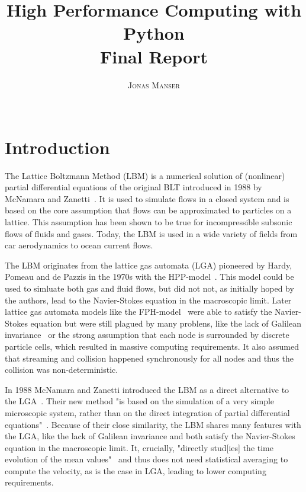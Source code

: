 \documentclass[a4paper,11pt, oneside]{book}
\title{\Huge \textbf{High Performance Computing with Python} \vspace{4mm} \\ \huge Final Report}
\author{\textsc{Jonas Manser} \\ \vspace{3mm}\text{4953222}  \\
\vspace{3mm}\text{jonas.burster@gmail.com}}
\begin{document}


\tableofcontents
\clearpage


\chapter{Introduction}
The Lattice Boltzmann Method (LBM) is a numerical solution of (nonlinear) partial differential equations of the original BLT introduced in 1988 by McNamara and Zanetti~\cite{mcnamara1988boltzmann-method}.
It is used to simulate flows in a closed system and is based on the core assumption that flows can be approximated to particles on a lattice.
This assumption has been shown to be true for incompressible subsonic flows of fluids and gases.
Today, the LBM is used in a wide variety of fields from car aerodynamics to ocean current flows.

The LBM originates from the lattice gas automata (LGA) pioneered by Hardy, Pomeau and de Pazzis in the 1970s with the HPP-model~\cite{hardy1973timeHPP}.
This model could be used to simluate both gas and fluid flows, but did not not, as initially hoped by the authors, lead to the Navier-Stokes equation in the macroscopic limit.
Later lattice gas automata models like the FPH-model~\cite{PhysRevLett.56.1505-fhp} were able to satisfy the Navier-Stokes equation but were still plagued by many problens, like the lack of Galilean invariance~\cite{nie2008galileanInvariance} or the strong assumption
that each node is surrounded by discrete particle cells, which resulted in massive computing requirements.
It also assumed that streaming and collision happened synchronously for all nodes and thus the collision was non-deterministic.

In 1988 McNamara and Zanetti introduced the LBM as a direct alternative to the LGA~\cite{mcnamara1988boltzmann-method}.
Their new method "is based on the simulation of a very simple microscopic system, rather than on the direct integration of partial differential equations"~\cite{mcnamara1988boltzmann-method}.
Because of their close similarity, the LBM shares many features with the LGA, like the lack of Galilean invariance and both satisfy the Navier-Stokes equation in the macroscopic limit.
It, crucially, "directly stud[ies] the time evolution of the mean values"~\cite{mcnamara1988boltzmann-method} and thus does not need statistical averaging to compute the velocity, as is the case in LGA, leading to lower computing requirements.
\end{document}
